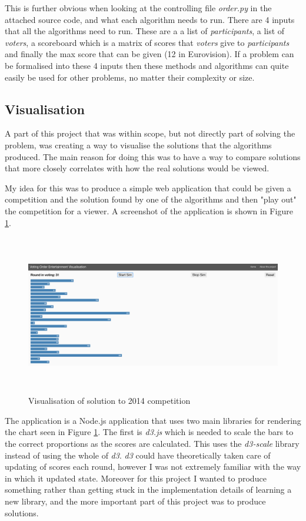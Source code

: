 \documentclass[12pt]{report}
\begin{document}
This is further obvious when looking at the controlling file \textit{order.py} in the attached source code, and what each algorithm needs to run. There are 4 inputs that all the algorithms need to run. These are a a list of \textit{participants}, a list of \textit{voters}, a scoreboard which is a matrix of scores that \textit{voters} give to \textit{participants} and finally the max score that can be given (12 in Eurovision). If a problem can be formalised into these 4 inputs then these methods and algorithms can quite easily be used for other problems, no matter their complexity or size.


\subsection{Visualisation}\label{Imp-Vis}
A part of this project that was within scope, but not directly part of solving the problem, was creating a way to visualise the solutions that the algorithms produced. The main reason for doing this was to have a way to compare solutions that more closely correlates with how the real solutions would be viewed.

My idea for this was to produce a simple web application that could be given a competition and the solution found by one of the algorithms and then "play out" the competition for a viewer. A screenshot of the application is shown in Figure \ref{visScreenshot}.

\begin{figure}[H]
\centering
\includegraphics[width=15cm, height=7cm]{./visualisation}
\caption{Visualisation of solution to 2014 competition}
\label{visScreenshot}
\end{figure}

The application is a Node.js application that uses two main libraries for rendering the chart seen in Figure \ref{visScreenshot}. The first is \textit{d3.js} which is needed to scale the bars to the correct proportions as the scores are calculated. This uses the \textit{d3-scale} library\cite{d3} instead of using the whole of \textit{d3}. \textit{d3} could have theoretically taken care of updating of scores each round, however I was not extremely familiar with the way in which it updated state. Moreover for this project I wanted to produce something rather than getting stuck in the implementation details of learning a new library, and the more important part of this project was to produce solutions.
\end{document}
